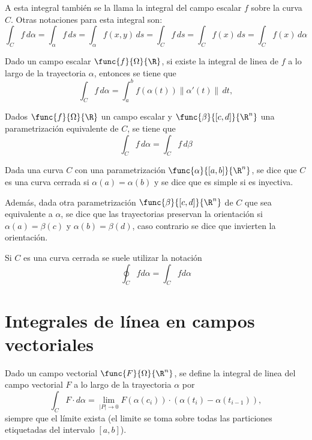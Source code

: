 \documentclass[a4,11pt]{aleph-notas}
\begin{document}
\begin{advertencia}
    A esta integral también se la llama la integral del campo escalar $f$ sobre la curva $C$. Otras notaciones para esta integral son:
    \[
        \int_C f \,d\alpha = \int_\alpha f \,ds 
        = \int_\alpha f(x,y) \,ds 
        = \int_C f \,ds
        = \int_C f(x) \,ds
        = \int_C f(x) \,d\alpha
    \]
\end{advertencia}

\begin{teo}
    Dado un campo escalar $\func{f}{\Omega}{\R}$, si existe la integral de linea de $f$ a lo largo de la trayectoria $\alpha$, entonces se tiene que
    \[
        \int_C f \,d\alpha
        =\int_a^b f(\alpha(t))\|\alpha'(t)\|\,dt,
    \]
\end{teo}

\begin{prop}
    Dados $\func{f}{\Omega}{\R}$ un campo escalar y $\func{\beta}{[c,d]}{\R^n}$ una parametrización equivalente de $C$, se tiene que
    \[
        \int_C f \,d\alpha = \int_C f \,d\beta
    \]
\end{prop}

\begin{defi}
    Dada una curva $C$ con una parametrización $\func{\alpha}{[a,b]}{\R^n}$, 
    se dice que $C$ es una curva cerrada si $\alpha(a)=\alpha(b)$ y se dice que es simple si es inyectiva. 
    
    Además, dada otra parametrización $\func{\beta}{[c,d]}{\R^n}$ de $C$ que sea equivalente a $\alpha$, se dice que las trayectorias preservan la orientación si $\alpha(a)=\beta(c)$ y $\alpha(b)=\beta(d)$, caso contrario se dice que invierten la orientación.
\end{defi}

\begin{advertencia}
    Si $C$ es una curva cerrada se suele utilizar la notación
    \[
        \oint_C f  d\alpha = \int_C f d\alpha
    \]
\end{advertencia}


\section{Integrales de línea en campos vectoriales}


\begin{defi}
    Dado un campo vectorial $\func{F}{\Omega}{\R^n}$, se define la integral de linea del campo vectorial $F$ a lo largo de la trayectoria $\alpha$ por
    \[
        \int_C F \cdot d\alpha 
        = \lim_{|P|\to 0} F(\alpha(c_i))\cdot (\alpha(t_i)-\alpha(t_{i-1}) ),
    \]
    siempre que el límite exista (el limite se toma sobre todas las particiones etiquetadas del intervalo $[a,b]$).
\end{defi}
\end{document}
